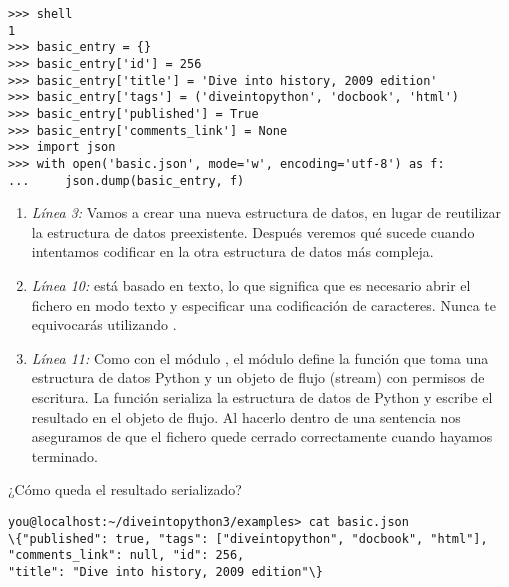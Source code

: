 \noindent\begin{minipage}{\textwidth}
\begin{lstlisting}[mathescape=True]
>>> shell
1
>>> basic_entry = {}
>>> basic_entry['id'] = 256
>>> basic_entry['title'] = 'Dive into history, 2009 edition'
>>> basic_entry['tags'] = ('diveintopython', 'docbook', 'html')
>>> basic_entry['published'] = True
>>> basic_entry['comments_link'] = None
>>> import json
>>> with open('basic.json', mode='w', encoding='utf-8') as f:
...     json.dump(basic_entry, f)
\end{lstlisting}
\end{minipage}

\begin{enumerate}

\item \emph{Línea 3:} Vamos a crear una nueva estructura de datos, en lugar de reutilizar la estructura de datos  preexistente. Después veremos qué sucede cuando intentamos codificar en  la otra estructura de datos más compleja.

\item \emph{Línea 10:}  está basado en texto, lo que significa que es necesario abrir el fichero en modo texto y especificar una codificación de caracteres. Nunca te equivocarás utilizando .

\item \emph{Línea 11:} Como con el módulo , el módulo  define la función  que toma una estructura de datos Python y un objeto de flujo (stream) con permisos de escritura. La función  serializa la estructura de datos de Python y escribe el resultado en el objeto de flujo. Al hacerlo dentro de una sentencia  nos aseguramos de que el fichero quede cerrado correctamente cuando hayamos terminado.

\end{enumerate}

¿Cómo queda el resultado serializado?

\begin{htmlonly}
\noindent\begin{minipage}{\textwidth}
\begin{lstlisting}[mathescape=False]
you@localhost:~/diveintopython3/examples> cat basic.json
\{"published": true, "tags": ["diveintopython", "docbook", "html"],
"comments_link": null, "id": 256,
"title": "Dive into history, 2009 edition"\}
\end{lstlisting}
\end{minipage}
\end{htmlonly}

